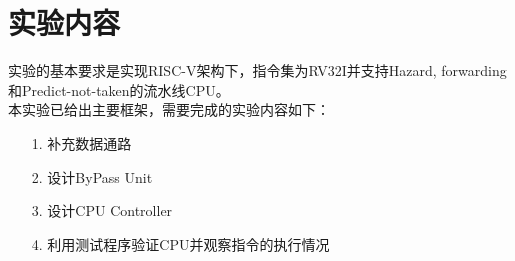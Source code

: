 
\section{实验内容}
实验的基本要求是实现RISC-V架构下，指令集为RV32I并支持Hazard, forwarding和Predict-not-taken的流水线CPU。 \\
本实验已给出主要框架，需要完成的实验内容如下：
\begin{itemize}
    \item [1.] 补充数据通路
    \item [2.] 设计ByPass Unit
    \item [3.] 设计CPU Controller
    \item [4.] 利用测试程序验证CPU并观察指令的执行情况
\end{itemize}  